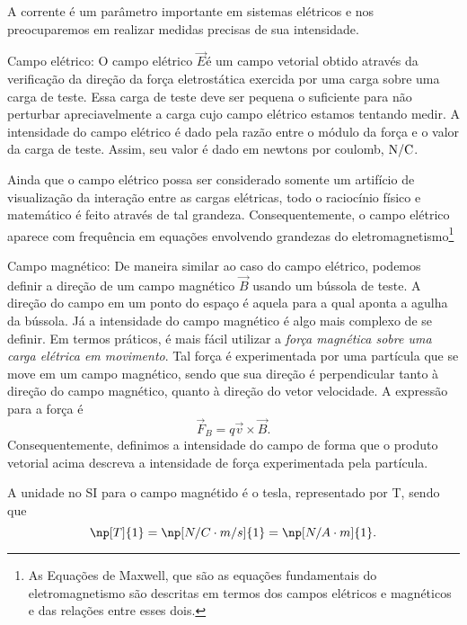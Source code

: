 \begin{description}
    A corrente é um parâmetro importante em sistemas elétricos e nos preocuparemos em realizar medidas precisas de sua intensidade.
    
    \item{Campo elétrico:} O campo elétrico $\vec{E}$é um campo vetorial obtido através da verificação da direção da força eletrostática exercida por uma carga sobre uma carga de teste. Essa carga de teste deve ser pequena o suficiente para não perturbar apreciavelmente a carga cujo campo elétrico estamos tentando medir. A intensidade do campo elétrico é dado pela razão entre o módulo da força e o valor da carga de teste. Assim, seu valor é dado em newtons por coulomb, $\rm{N}/\rm{C}$.
    
    Ainda que o campo elétrico possa ser considerado somente um artifício de visualização da interação entre as cargas elétricas, todo o raciocínio físico e matemático é feito através de tal grandeza. Consequentemente, o campo elétrico aparece com frequência em equações envolvendo grandezas do eletromagnetismo\footnote{As Equações de Maxwell, que são as equações fundamentais do eletromagnetismo são descritas em termos dos campos elétricos e magnéticos e das relações entre esses dois.}
    
    \item{Campo magnético:} De maneira similar ao caso do campo elétrico, podemos definir a direção de um campo magnético $\vec{B}$ usando um bússola de teste. A direção do campo em um ponto do espaço é aquela para a qual aponta a agulha da bússola. Já a intensidade do campo magnético é algo mais complexo de se definir. Em termos práticos, é mais fácil utilizar a \emph{força magnética sobre uma carga elétrica em movimento}. Tal força é experimentada por uma partícula que se move em um campo magnético, sendo que sua direção é perpendicular tanto à direção do campo magnético, quanto à direção do vetor velocidade. A expressão para a força é
    \begin{equation}\label{Eq:DefFMagChar}
        \vec{F}_B = q \vec{v}\times\vec{B}.
    \end{equation}
    Consequentemente, definimos a intensidade do campo de forma que o produto vetorial acima descreva a intensidade de força experimentada pela partícula.
    
    A unidade no SI para o campo magnétido é o tesla, representado por T, sendo que
    \begin{equation}
        \np[T]{1} = \np[N/C\cdot m/s]{1} = \np[N/A\cdot m]{1}.
    \end{equation}
    

\end{description}
